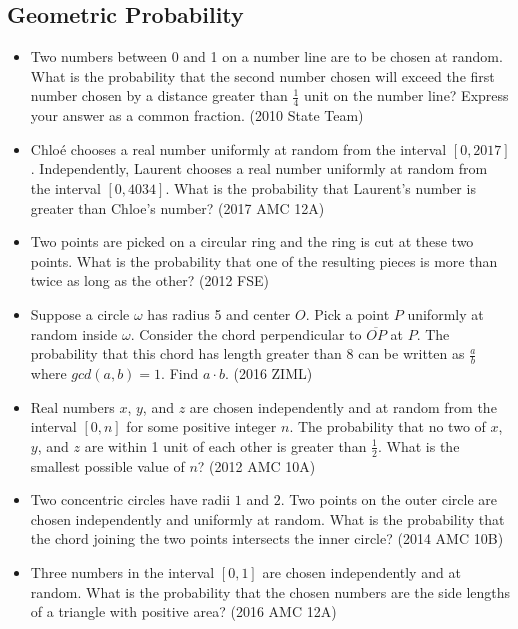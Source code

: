 \documentclass{article}
\begin{document}
\subsection{Geometric Probability}

\begin{itemize}

\item Two numbers between 0 and 1 on a number line are to be chosen at random. What is the probability that the second number chosen will exceed the first number chosen by a distance greater than $\tfrac{1}{4}$ unit on the number line? Express your answer as a common fraction. (2010 State Team)

\item Chloé chooses a real number uniformly at random from the interval $ [ 0,2017 ]$. Independently, Laurent chooses a real number uniformly at random from the interval $[ 0 , 4034 ]$. What is the probability that Laurent's number is greater than Chloe's number? (2017 AMC 12A)

\item Two points are picked on a circular ring and the ring is cut at these two points. What is the probability that one of the resulting pieces is more than twice as long as the other? (2012 FSE)

\item Suppose a circle $\omega$ has radius 5 and center $O$. Pick a point $P$ uniformly at random inside $\omega$. Consider the chord perpendicular to $\overline{OP}$ at $P$. The probability that this chord has length greater than 8 can be written as $\frac{a}{b}$ where $gcd(a,b)=1$. Find $a\cdot b$. (2016 ZIML)

\item Real numbers $x$, $y$, and $z$ are chosen independently and at random from the interval $[0,n]$ for some positive integer $n$. The probability that no two of $x$, $y$, and $z$ are within 1 unit of each other is greater than $\frac {1}{2}$. What is the smallest possible value of $n$? (2012 AMC 10A)

\item Two concentric circles have radii $1$ and $2$. Two points on the outer circle are chosen independently and uniformly at random. What is the probability that the chord joining the two points intersects the inner circle? (2014 AMC 10B)

\item Three numbers in the interval $\left[0,1\right]$ are chosen independently and at random. What is the probability that the chosen numbers are the side lengths of a triangle with positive area? (2016 AMC 12A)



\end{itemize}
\end{document}
